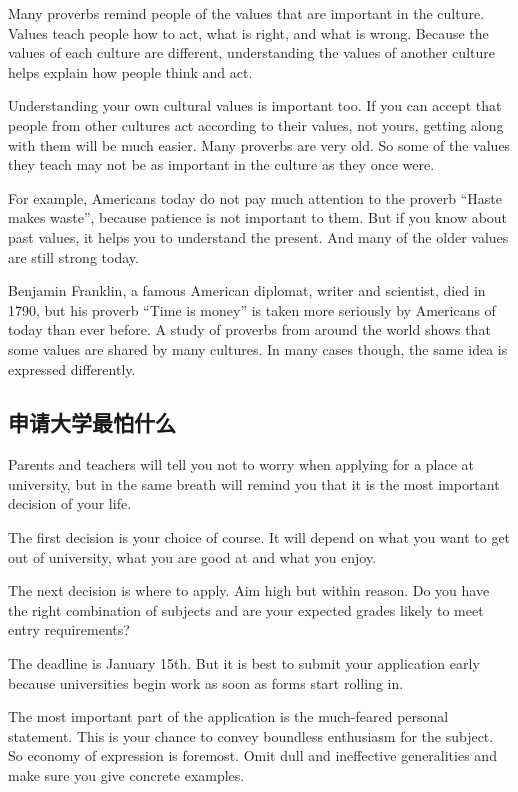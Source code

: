 Many proverbs remind people of the values that are
important in the culture. Values teach people how to act,
what is right, and what is wrong. Because the values of
each culture are different, understanding the values of
another culture helps explain how people think and act.

Understanding your own cultural values is important too.
If you can accept that people from other cultures act according
to their values, not yours, getting along with them
will be much easier. Many proverbs are very old. So
some of the values they teach may not be as important in
the culture as they once were.

For example, Americans today do not pay much attention
to the proverb “Haste makes waste”, because patience is
not important to them. But if you know about past values, it
helps you to understand the present. And many of the older
values are still strong today.

Benjamin Franklin, a famous American diplomat, writer
and scientist, died in 1790, but his proverb “Time is money”
is taken more seriously by Americans of today than ever
before. A study of proverbs from around the world
shows that some values are shared by many cultures. In
many cases though, the same idea is expressed differently.
\subsection{申请大学最怕什么}
\begin{margintable}\vspace{-2cm}\footnotesize
\end{margintable}
Parents and teachers will tell you not to worry when applying
for a place at university, but in the same breath will remind
you that it is the most important decision of your life.

The first decision is your choice of course. It will depend
on what you want to get out of university, what you
are good at and what you enjoy.

The next decision is where to apply. Aim high but within
reason. Do you have the right combination of subjects and
are your expected grades likely to meet entry requirements?

The deadline is January 15th. But it is best to submit your
application early because universities begin work as soon
as forms start rolling in.

The most important part of the application is the
much-feared personal statement. This is your chance to
convey boundless enthusiasm for the subject. So economy
of expression is foremost. Omit dull and ineffective generalities
and make sure you give concrete examples.

